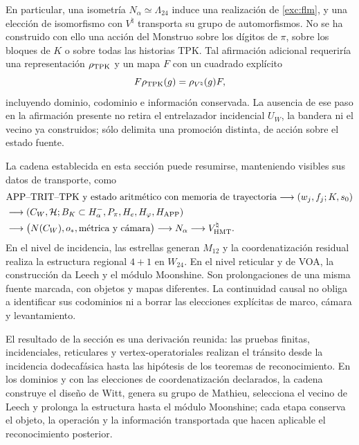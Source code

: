 En particular, una isometría $N_\alpha\simeq\Lambda_{24}$ induce
una realización de \eqref{exc:flm}, y una elección de isomorfismo
con $V^\natural$ transporta su grupo de automorfismos. No se ha
construido con ello una acción del Monstruo sobre los dígitos de
$\pi$, sobre los bloques de $K$ o sobre todas las historias TPK.
Tal afirmación adicional requeriría una representación
$\rho_{\rm TPK}$ y un mapa $F$ con un cuadrado explícito
\[
 F\rho_{\rm TPK}(g)=\rho_{V^\natural}(g)F,
\]
incluyendo dominio, codominio e información conservada. La ausencia
de ese paso en la afirmación presente no retira el entrelazador
incidencial $U_W$, la bandera ni el vecino ya construidos; sólo
delimita una promoción distinta, de acción sobre el estado fuente.

La cadena establecida en esta sección puede resumirse, manteniendo
visibles sus datos de transporte, como
\begin{align*}
 &\text{APP--TRIT--TPK y estado aritmético con memoria de trayectoria}
   \longrightarrow (w_j,f_j;K,s_0)\\
 &\longrightarrow (C_W,\mathcal H;B_K\subset H^-_\alpha,
                   P_\pi,H_e,H_\varphi,H_{\rm APP})\\
 &\longrightarrow \bigl(N(C_W),o_*,\text{métrica y cámara}\bigr)
   \longrightarrow N_\alpha
   \longrightarrow V^\natural_{\rm HMT}.
\end{align*}
En el nivel de incidencia, las estrellas generan $M_{12}$ y la
coordenatización residual realiza la estructura regional $4+1$ en $W_{24}$.
En el nivel reticular y de VOA, la construcción da Leech y el módulo
Moonshine. Son prolongaciones de una misma fuente marcada, con
objetos y mapas diferentes. La continuidad causal no obliga a
identificar sus codominios ni a borrar las elecciones explícitas
de marco, cámara y levantamiento.

El resultado de la sección es una derivación reunida: las pruebas finitas,
incidenciales, reticulares y vertex-operatoriales realizan el tránsito desde
la incidencia dodecafásica hasta las hipótesis de los teoremas de
reconocimiento. En los dominios y con las elecciones de coordenatización declarados,
la cadena construye el diseño de Witt, genera su grupo de Mathieu, selecciona
el vecino de Leech y prolonga la estructura hasta el módulo Moonshine; cada
etapa conserva el objeto, la operación y la información transportada que
hacen aplicable el reconocimiento posterior.

